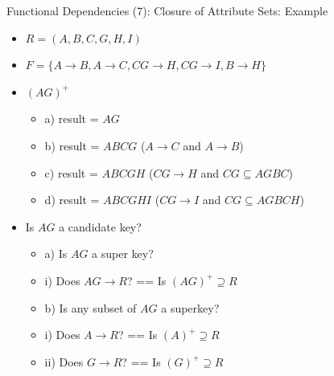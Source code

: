 \documentclass[aspectratio=169, xcolor=dvipsnames]{beamer}
\begin{document}
\begin{frame}{Functional Dependencies (7): Closure of Attribute Sets: Example}
    \begin{itemize}[<+->]
        \item $R = (A, B, C, G, H, I)$
        \item $F = \{A \rightarrow B, A \rightarrow C, CG \rightarrow H, CG \rightarrow I, B \rightarrow H\}$
        \item $(AG)^+$
        \begin{itemize}
            \item[$\triangleright$] a) result = $AG$
            \item[$\triangleright$] b) result = $ABCG$ ($A \rightarrow C$ and $A \rightarrow B$)
            \item[$\triangleright$] c) result = $ABCGH$ ($CG \rightarrow H$ and $CG \subseteq AGBC$)
            \item[$\triangleright$] d) result = $ABCGHI$ ($CG \rightarrow I$ and $CG \subseteq AGBCH$)
        \end{itemize}
        \item Is $AG$ a candidate key?
        \begin{itemize}
            \item[$\triangleright$] a) Is $AG$ a super key?
            \item[$\triangleright$] i) Does $AG \rightarrow R$? == Is $(AG)^+ \supseteq R$
            \item[$\triangleright$] b) Is any subset of $AG$ a superkey?
            \item[$\triangleright$] i) Does $A \rightarrow R$? == Is $(A)^+ \supseteq R$
            \item[$\triangleright$] ii) Does $G \rightarrow R$? == Is $(G)^+ \supseteq R$
        \end{itemize}
    \end{itemize}
\end{frame}
\end{document}
